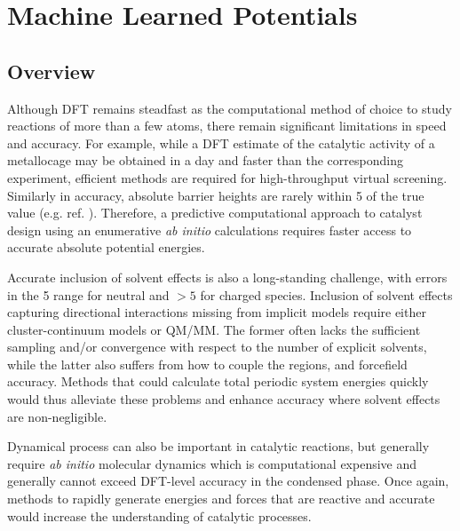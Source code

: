 \documentclass[../../main.tex]{subfiles}
\begin{document}
\setcounter{footnote}{0} 
\newcommand{\rom}[1]{\uppercase\expandafter{\romannumeral #1\relax}}


\chapter{Machine Learned Potentials}

\section{Overview}

Although DFT remains steadfast as the computational method of choice to study reactions of more than a few atoms,\cite{PribramJones2015} there remain significant limitations in speed and accuracy.\cite{Mardirossian2017} For example, while a DFT estimate of the catalytic activity of a metallocage may be obtained in a day\cite{Young2019} and faster than the corresponding experiment, efficient methods are required for high-throughput virtual screening. Similarly in accuracy, absolute barrier heights are rarely within 5 \kcalx of the true value (e.g. ref. \cite{Krongchon2017}). Therefore, a predictive computational approach to catalyst design using an enumerative \emph{ab initio} calculations requires faster access to accurate absolute potential energies. 

Accurate inclusion of solvent effects is also a long-standing challenge, with errors in the 5 \kcalx range for neutral and
$>5$ \kcalx for charged species.\cite{Zhang2017} Inclusion of solvent effects capturing directional interactions missing from implicit models require either cluster-continuum models or QM/MM. The former often lacks the sufficient sampling and/or convergence with respect to the number of explicit solvents,\cite{Basdogan2018} while the latter also suffers from how to couple the regions, and forcefield accuracy.\cite{Thiel2009} Methods that could calculate total periodic system energies quickly would thus alleviate these problems and enhance accuracy where solvent effects are non-negligible.

Dynamical process can also be important in catalytic reactions,\cite{Grajciar2018, Stirling2014} but generally require \emph{ab initio} molecular dynamics which is computational expensive and generally cannot exceed DFT-level accuracy in the condensed phase.\cite{Hassanali2014} Once again, methods to rapidly generate energies and forces that are reactive and accurate would increase the understanding of catalytic processes.
\end{document}
